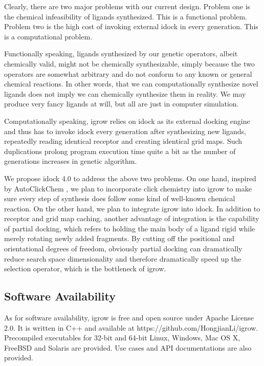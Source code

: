 Clearly, there are two major problems with our current design. Problem one is the chemical infeasibility of ligands synthesized. This is a functional problem. Problem two is the high cost of invoking external idock in every generation. This is a computational problem.

Functionally speaking, ligands synthesized by our genetic operators, albeit chemically valid, might not be chemically synthesizable, simply because the two operators are somewhat arbitrary and do not conform to any known or general chemical reactions. In other words, that we can computationally synthesize novel ligands does not imply we can chemically synthesize them in reality. We may produce very fancy ligands at will, but all are just in computer simulation.

Computationally speaking, igrow relies on idock as its external docking engine and thus has to invoke idock every generation after synthesizing new ligands, repeatedly reading identical receptor and creating identical grid maps. Such duplications prolong program execution time quite a bit as the number of generations increases in genetic algorithm.

We propose idock 4.0 to address the above two problems. On one hand, inspired by AutoClickChem \citep{1051}, we plan to incorporate click chemistry into igrow to make sure every step of synthesis does follow some kind of well-known chemical reaction. On the other hand, we plan to integrate igrow into idock. In addition to receptor and grid map caching, another advantage of integration is the capability of partial docking, which refers to holding the main body of a ligand rigid while merely rotating newly added fragments. By cutting off the positional and orientational degrees of freedom, obviously partial docking can dramatically reduce search space dimensionality and therefore dramatically speed up the selection operator, which is the bottleneck of igrow.

\subsection{Software Availability}

As for software availability, igrow is free and open source under Apache License 2.0. It is written in C++ and available at https://github.com/HongjianLi/igrow. Precompiled executables for 32-bit and 64-bit Linux, Windows, Mac OS X, FreeBSD and Solaris are provided. Use cases and API documentations are also provided.

